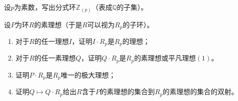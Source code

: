 \begin{prob}
设$p$为素数，写出分式环$\mathbb{Z}_{(p)}$（表成$\mathbb{Q}$的子集）。
\end{prob}
\begin{prob}
设$P$为环$R$的素理想（于是$R$可以视为$R_{p}$的子环）。
\begin{enumerate}[$(1)$]
\item 对于$R$的任一理想$I$，证明$I\cdot R_{p}$是$R_{p}$的理想；
\item 对于$R$的任一素理想$Q$，证明$Q\cdot R_{p}$是$R_{p}$的素理想或平凡理想$(1)$。
\item 证明$P\cdot R_{p}$是$R_{p}$唯一的极大理想；
\item 证明$Q\longmapsto Q\cdot R_{p}$给出$R$含于$P$的素理想的集合到$R_{p}$的素理想的集合的双射。
\end{enumerate}
\end{prob}
